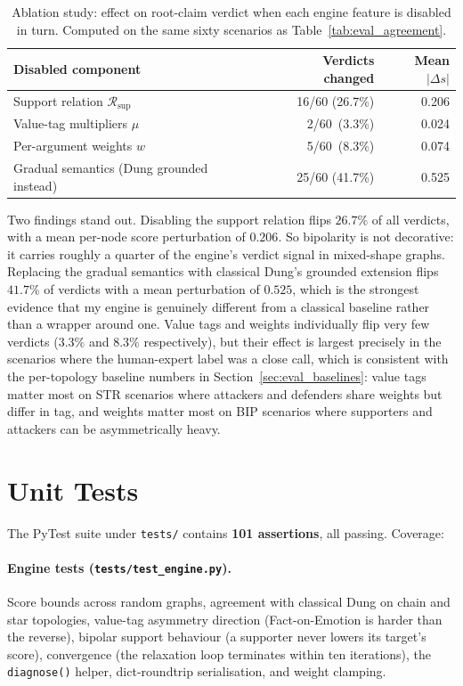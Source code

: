 \begin{table}[h]
\centering
\caption{Ablation study: effect on root-claim verdict when each engine feature is disabled in turn. Computed on the same sixty scenarios as Table~\ref{tab:eval_agreement}.}
\label{tab:ablation}
\begin{tabular}{lrr}
\toprule
Disabled component & Verdicts changed & Mean $|\Delta s|$ \\
\midrule
Support relation $\mathcal{R}_{\text{sup}}$            & 16/60 (26.7\%) & 0.206 \\
Value-tag multipliers $\mu$                            & \phantom{0}2/60 \,(3.3\%) & 0.024 \\
Per-argument weights $w$                               & \phantom{0}5/60 \,(8.3\%) & 0.074 \\
Gradual semantics (Dung grounded instead)              & 25/60 (41.7\%) & 0.525 \\
\bottomrule
\end{tabular}
\end{table}

Two findings stand out. Disabling the support relation flips $26.7\%$ of all verdicts, with a mean per-node score perturbation of $0.206$. So bipolarity is not decorative: it carries roughly a quarter of the engine's verdict signal in mixed-shape graphs. Replacing the gradual semantics with classical Dung's grounded extension flips $41.7\%$ of verdicts with a mean perturbation of $0.525$, which is the strongest evidence that my engine is genuinely different from a classical baseline rather than a wrapper around one. Value tags and weights individually flip very few verdicts ($3.3\%$ and $8.3\%$ respectively), but their effect is largest precisely in the scenarios where the human-expert label was a close call, which is consistent with the per-topology baseline numbers in Section~\ref{sec:eval_baselines}: value tags matter most on STR scenarios where attackers and defenders share weights but differ in tag, and weights matter most on BIP scenarios where supporters and attackers can be asymmetrically heavy.

\section{Unit Tests}
\label{sec:eval_tests}
The PyTest suite under \texttt{tests/} contains \textbf{101 assertions}, all passing. Coverage:

\paragraph{Engine tests (\texttt{tests/test\_engine.py}).} Score bounds across random graphs, agreement with classical Dung on chain and star topologies, value-tag asymmetry direction (Fact-on-Emotion is harder than the reverse), bipolar support behaviour (a supporter never lowers its target's score), convergence (the relaxation loop terminates within ten iterations), the \texttt{diagnose()} helper, dict-roundtrip serialisation, and weight clamping.

